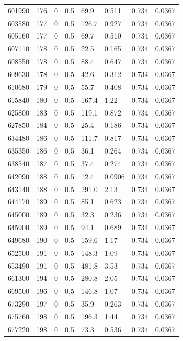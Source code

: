 \documentclass[preview]{standalone}
\begin{document}
{{{{{{{{{{{\begin{tabular}{L{1.2cm}C{1.2cm} C{0.3cm}C{0.5cm} C{1.4cm}C{1.4cm} C{1.4cm}C{1.4cm}}
  601990  &   176  & 0     & 0.5 &  69.9  & 0.511  & 0.734 &  0.0367   \\ 
  603580  &   177  & 0     & 0.5 &  126.7  & 0.927  & 0.734 &  0.0367   \\ 
  605160  &   177  & 0     & 0.5 &  69.7  & 0.510  & 0.734 &  0.0367   \\ 
  607110  &   178  & 0     & 0.5 &  22.5  & 0.165  & 0.734 &  0.0367   \\ 
  608550  &   178  & 0     & 0.5 &  88.4  & 0.647  & 0.734 &  0.0367   \\ 
  609630  &   178  & 0     & 0.5 &  42.6  & 0.312  & 0.734 &  0.0367   \\ 
  610680  &   179  & 0     & 0.5 &  55.7  & 0.408  & 0.734 &  0.0367   \\ 
  615840  &   180  & 0     & 0.5 &  167.4  & 1.22  & 0.734 &  0.0367   \\ 
  625800  &   183  & 0     & 0.5 &  119.1  & 0.872  & 0.734 &  0.0367   \\ 
  627850  &   184  & 0     & 0.5 &  25.4  & 0.186  & 0.734 &  0.0367   \\ 
  634480  &   186  & 0     & 0.5 &  111.7  & 0.817  & 0.734 &  0.0367   \\ 
  635350  &   186  & 0     & 0.5 &  36.1  & 0.264  & 0.734 &  0.0367   \\ 
  638540  &   187  & 0     & 0.5 &  37.4  & 0.274  & 0.734 &  0.0367   \\ 
  642090  &   188  & 0     & 0.5 &  12.4  & 0.0906  & 0.734 &  0.0367   \\ 
  643140  &   188  & 0     & 0.5 &  291.0  & 2.13  & 0.734 &  0.0367   \\ 
  644170  &   189  & 0     & 0.5 &  85.1  & 0.623  & 0.734 &  0.0367   \\ 
  645000  &   189  & 0     & 0.5 &  32.3  & 0.236  & 0.734 &  0.0367   \\ 
  645900  &   189  & 0     & 0.5 &  94.1  & 0.689  & 0.734 &  0.0367   \\ 
  649680  &   190  & 0     & 0.5 &  159.6  & 1.17  & 0.734 &  0.0367   \\ 
  652500  &   191  & 0     & 0.5 &  148.3  & 1.09  & 0.734 &  0.0367   \\ 
  653490  &   191  & 0     & 0.5 &  481.8  & 3.53  & 0.734 &  0.0367   \\ 
  661300  &   194  & 0     & 0.5 &  280.8  & 2.05  & 0.734 &  0.0367   \\ 
  669500  &   196  & 0     & 0.5 &  146.8  & 1.07  & 0.734 &  0.0367   \\ 
  673290  &   197  & 0     & 0.5 &  35.9  & 0.263  & 0.734 &  0.0367   \\ 
  675760  &   198  & 0     & 0.5 &  196.3  & 1.44  & 0.734 &  0.0367   \\ 
  677220  &   198  & 0     & 0.5 &  73.3  & 0.536  & 0.734 &  0.0367   \\ 
\hline 
\end{tabular} 

}}}}}}}}}}}
\end{document}
